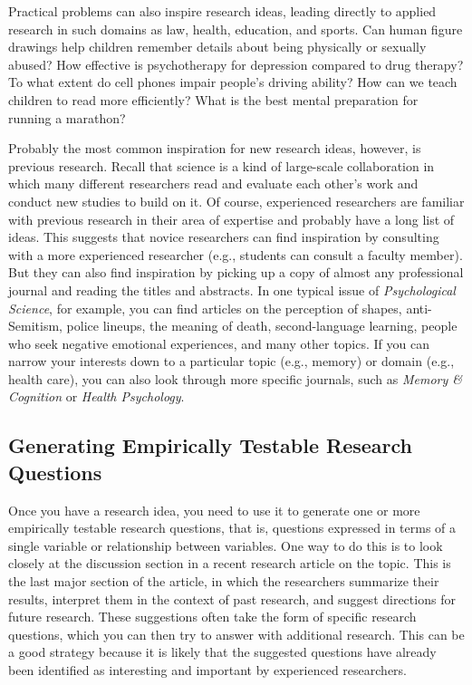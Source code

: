 \documentclass[
]{krantz}
\begin{document}
Practical problems can also inspire research ideas, leading directly to applied research in such domains as law, health, education, and sports. Can human figure drawings help children remember details about being physically or sexually abused? How effective is psychotherapy for depression compared to drug therapy? To what extent do cell phones impair people's driving ability? How can we teach children to read more efficiently? What is the best mental preparation for running a marathon?

Probably the most common inspiration for new research ideas, however, is previous research. Recall that science is a kind of large-scale collaboration in which many different researchers read and evaluate each other's work and conduct new studies to build on it. Of course, experienced researchers are familiar with previous research in their area of expertise and probably have a long list of ideas. This suggests that novice researchers can find inspiration by consulting with a more experienced researcher (e.g., students can consult a faculty member). But they can also find inspiration by picking up a copy of almost any professional journal and reading the titles and abstracts. In one typical issue of \emph{Psychological Science}, for example, you can find articles on the perception of shapes, anti-Semitism, police lineups, the meaning of death, second-language learning, people who seek negative emotional experiences, and many other topics. If you can narrow your interests down to a particular topic (e.g., memory) or domain (e.g., health care), you can also look through more specific journals, such as \emph{Memory \& Cognition} or \emph{Health Psychology}.

\hypertarget{generating-empirically-testable-research-questions}{%
\subsection*{Generating Empirically Testable Research Questions}\label{generating-empirically-testable-research-questions}}


Once you have a research idea, you need to use it to generate one or more empirically testable research questions, that is, questions expressed in terms of a single variable or relationship between variables. One way to do this is to look closely at the discussion section in a recent research article on the topic. This is the last major section of the article, in which the researchers summarize their results, interpret them in the context of past research, and suggest directions for future research. These suggestions often take the form of specific research questions, which you can then try to answer with additional research. This can be a good strategy because it is likely that the suggested questions have already been identified as interesting and important by experienced researchers.
\end{document}

